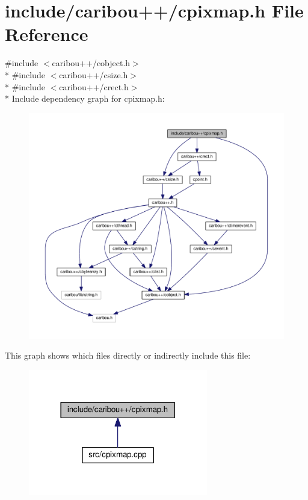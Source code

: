 \section{include/caribou++/cpixmap.h File Reference}
\label{cpixmap_8h}
{\ttfamily \#include $<$caribou++/cobject.\+h$>$}\\*
{\ttfamily \#include $<$caribou++/csize.\+h$>$}\\*
{\ttfamily \#include $<$caribou++/crect.\+h$>$}\\*
Include dependency graph for cpixmap.\+h\+:
\nopagebreak
\begin{figure}[H]
\begin{center}
\leavevmode
\includegraphics[width=350pt]{cpixmap_8h__incl}
\end{center}
\end{figure}
This graph shows which files directly or indirectly include this file\+:
\nopagebreak
\begin{figure}[H]
\begin{center}
\leavevmode
\includegraphics[width=222pt]{cpixmap_8h__dep__incl}
\end{center}
\end{figure}
